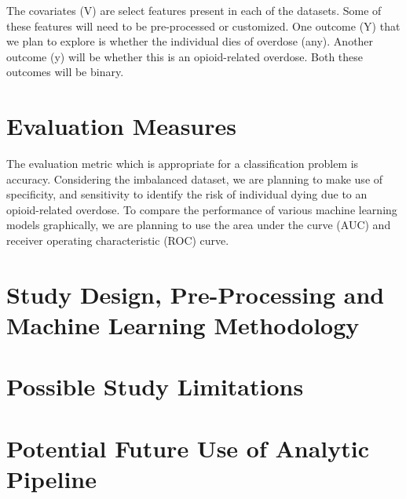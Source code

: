 \documentclass[twoside,11pt]{article}
\begin{document}
The covariates (V) are select features present in each of the datasets. Some of these features will need to be pre-processed or customized. One outcome (Y) that we plan to explore is whether the individual dies of overdose (any). Another outcome (y) will be whether this is an opioid-related overdose. Both these outcomes will be binary. 

\section{Evaluation Measures}
The evaluation metric which is appropriate for a classification problem is accuracy. Considering the imbalanced dataset, we are planning to make use of specificity, and sensitivity to identify the risk of individual dying due to an opioid-related overdose. To compare the performance of various machine learning models graphically, we are planning to use the area under the curve (AUC) and receiver operating characteristic (ROC) curve.  

\section{Study Design, Pre-Processing and Machine Learning Methodology}


\section{Possible Study Limitations}

\section{Potential Future Use of Analytic Pipeline}

\newpage


\end{document}
